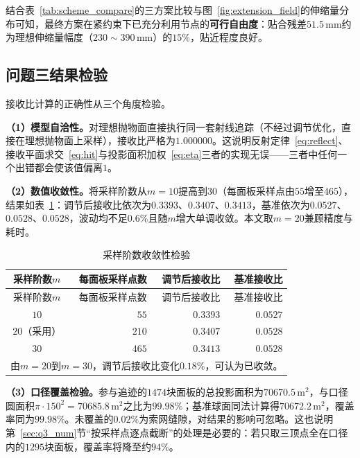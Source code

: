 \documentclass[withoutpreface]{cumcmthesis}
\begin{document}
结合表~\ref{tab:scheme_compare}的三方案比较与图~\ref{fig:extension_field}的伸缩量分布可知，最终方案在紧约束下已充分利用节点的\textbf{可行自由度}：贴合残差$51.5\,\mathrm{mm}$约为理想伸缩量幅度（$230\sim390\,\mathrm{mm}$）的$15\%$，贴近程度良好。

\subsection{问题三结果检验}\label{sec:q3_verify}

接收比计算的正确性从三个角度检验。

\textbf{（1）模型自洽性。}对理想抛物面直接执行同一套射线追踪（不经过调节优化，直接在理想抛物面上采样），接收比严格为$1.000000$。这说明反射定律~\eqref{eq:reflect}、接收平面求交~\eqref{eq:hit}与投影面积加权~\eqref{eq:eta}三者的实现无误——三者中任何一个出错都会使该值偏离$1$。

\textbf{（2）数值收敛性。}将采样阶数从$m=10$提高到$30$（每面板采样点由$55$增至$465$），结果如表~\ref{tab:conv}：调节后接收比依次为$0.3393$、$0.3407$、$0.3413$，基准依次为$0.0527$、$0.0528$、$0.0528$，波动均不足$0.6\%$且随$m$增大单调收敛。本文取$m=20$兼顾精度与耗时。

\begin{longtable}{c r r r}
\caption{采样阶数收敛性检验} \label{tab:conv} \\
\toprule
采样阶数$m$ & 每面板采样点数 & 调节后接收比 & 基准接收比 \\
\midrule
\endfirsthead
\toprule
采样阶数$m$ & 每面板采样点数 & 调节后接收比 & 基准接收比 \\
\midrule
\endhead
\bottomrule
\endfoot
\bottomrule
\endlastfoot
$10$ & $55$ & $0.3393$ & $0.0527$ \\
$20$（采用） & $210$ & $0.3407$ & $0.0528$ \\
$30$ & $465$ & $0.3413$ & $0.0528$ \\
\midrule
\multicolumn{4}{p{12.0cm}}{\small 由$m=20$到$m=30$，调节后接收比变化$0.18\%$，可认为已收敛。}\\
\bottomrule
\end{longtable}

\textbf{（3）口径覆盖检验。}参与追迹的$1474$块面板的总投影面积为$70670.5\,\mathrm{m}^{2}$，与口径圆面积$\pi\cdot150^{2}=70685.8\,\mathrm{m}^{2}$之比为$99.98\%$；基准球面同法计算得$70672.2\,\mathrm{m}^{2}$，覆盖率同为$99.98\%$。未覆盖的$0.02\%$为索网缝隙，对结果的影响可忽略。这也说明第~\ref{sec:q3_num}节``按采样点逐点截断''的处理是必要的：若只取三顶点全在口径内的$1295$块面板，覆盖率将降至约$94\%$。
\end{document}
